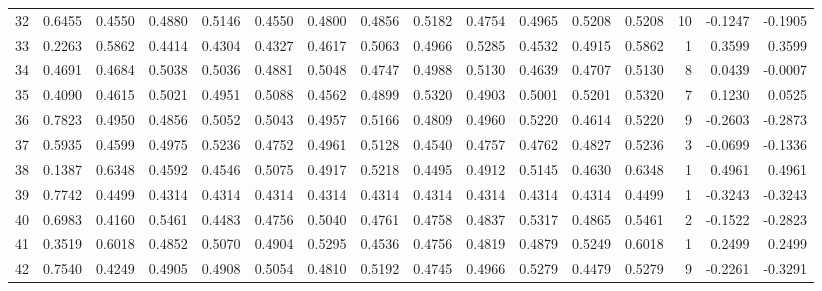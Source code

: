 \begin{tabular}{lrrrrrrrrrrrrrrr}
32  &      0.6455 &  0.4550 &  0.4880 &  0.5146 &  0.4550 &  0.4800 &  0.4856 &  0.5182 &  0.4754 &  0.4965 &   0.5208 &     0.5208 &     10 &                   -0.1247 &                    -0.1905 \\
33  &      0.2263 &  0.5862 &  0.4414 &  0.4304 &  0.4327 &  0.4617 &  0.5063 &  0.4966 &  0.5285 &  0.4532 &   0.4915 &     0.5862 &      1 &                    0.3599 &                     0.3599 \\
34  &      0.4691 &  0.4684 &  0.5038 &  0.5036 &  0.4881 &  0.5048 &  0.4747 &  0.4988 &  0.5130 &  0.4639 &   0.4707 &     0.5130 &      8 &                    0.0439 &                    -0.0007 \\
35  &      0.4090 &  0.4615 &  0.5021 &  0.4951 &  0.5088 &  0.4562 &  0.4899 &  0.5320 &  0.4903 &  0.5001 &   0.5201 &     0.5320 &      7 &                    0.1230 &                     0.0525 \\
36  &      0.7823 &  0.4950 &  0.4856 &  0.5052 &  0.5043 &  0.4957 &  0.5166 &  0.4809 &  0.4960 &  0.5220 &   0.4614 &     0.5220 &      9 &                   -0.2603 &                    -0.2873 \\
37  &      0.5935 &  0.4599 &  0.4975 &  0.5236 &  0.4752 &  0.4961 &  0.5128 &  0.4540 &  0.4757 &  0.4762 &   0.4827 &     0.5236 &      3 &                   -0.0699 &                    -0.1336 \\
38  &      0.1387 &  0.6348 &  0.4592 &  0.4546 &  0.5075 &  0.4917 &  0.5218 &  0.4495 &  0.4912 &  0.5145 &   0.4630 &     0.6348 &      1 &                    0.4961 &                     0.4961 \\
39  &      0.7742 &  0.4499 &  0.4314 &  0.4314 &  0.4314 &  0.4314 &  0.4314 &  0.4314 &  0.4314 &  0.4314 &   0.4314 &     0.4499 &      1 &                   -0.3243 &                    -0.3243 \\
40  &      0.6983 &  0.4160 &  0.5461 &  0.4483 &  0.4756 &  0.5040 &  0.4761 &  0.4758 &  0.4837 &  0.5317 &   0.4865 &     0.5461 &      2 &                   -0.1522 &                    -0.2823 \\
41  &      0.3519 &  0.6018 &  0.4852 &  0.5070 &  0.4904 &  0.5295 &  0.4536 &  0.4756 &  0.4819 &  0.4879 &   0.5249 &     0.6018 &      1 &                    0.2499 &                     0.2499 \\
42  &      0.7540 &  0.4249 &  0.4905 &  0.4908 &  0.5054 &  0.4810 &  0.5192 &  0.4745 &  0.4966 &  0.5279 &   0.4479 &     0.5279 &      9 &                   -0.2261 &                    -0.3291 \\

\end{tabular}
